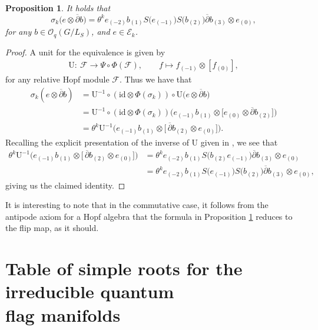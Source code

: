 \documentclass[10pt,a4paper]{amsart}
\numberwithin{equation}{section}
\newtheorem{prop}[Theorem]{Proposition}
 { \theoremstyle{definition}
\newtheorem{defn}[Theorem]{Definition}
\newtheorem{Note}[Theorem]{Note}
\newtheorem{eg}[Theorem]{Example}
\newtheorem{Remark}[Theorem]{Remark} }
\newcommand\adel{\overline{\partial}}
\newcommand\unit{\mathrm{U}}
\begin{document}
\begin{prop} \label{prop:Global.Tak}It holds that
\[
\sigma_{k}\big(e \otimes \adel b\big) = \theta^k e_{(-2)} b_{(1)} S\big(e_{(-1)}\big)S\big(b_{(2)}\big)\adel b_{(3)} \otimes e_{(0)},
\]
for any $b \in \mathcal{O}_q(G/L_S)$, and $e \in \mathcal{E}_k$.
\end{prop}
\begin{proof}
A unit for the equivalence is given by
\begin{gather*}
\unit\colon \ \mathcal{F} \to \Psi \circ \Phi(\mathcal{F}), \qquad f \mapsto f_{(-1)} \otimes [f_{(0)}],
\end{gather*}
for any relative Hopf module $\mathcal{F}$. Thus we have that
\begin{align*}
\sigma_k(e \otimes \adel b) &= \unit^{-1} \circ (\mathrm{id} \otimes \Phi(\sigma_k)) \circ \unit\big(e \otimes \adel b\big)\\
&= \unit^{-1} \circ (\mathrm{id} \otimes \Phi(\sigma_k))\big(e_{(-1)}b_{(1)} \otimes \big[e_{(0)} \otimes \adel b_{(2)}\big]\big)\\
&= \theta^k \unit^{-1} \big(e_{(-1)}b_{(1)} \otimes \big[\,\adel b_{(2)} \otimes e_{(0)}\big]\big).
\end{align*}
Recalling the explicit presentation of the inverse of $\unit$ given in \cite[Corollary~2.7]{MMF2}, we see that
\begin{align*}
\theta^k \unit^{-1} \big(e_{(-1)}b_{(1)} \otimes \big[\,\adel b_{(2)} \otimes e_{(0)}\big]\big) &= \theta^k e_{(-2)}b_{(1)} S\big(b_{(2)}e_{(-1)}\big)\adel b_{(3)} \otimes e_{(0)}\\
&= \theta^k e_{(-2)} b_{(1)} S\big(e_{(-1)}\big)S\big(b_{(2)}\big)\adel b_{(3)} \otimes e_{(0)},
\end{align*}
giving us the claimed identity.
\end{proof}

It is interesting to note that in the commutative case, it follows from the antipode axiom for a Hopf algebra that the formula in Proposition \ref{prop:Global.Tak} reduces to the flip map, as it should.

\appendix


\section[Table of simple roots for the irreducible quantum flag manifolds]{Table of simple roots for the irreducible quantum\\ flag manifolds}\label{appendixA}
\end{document}
